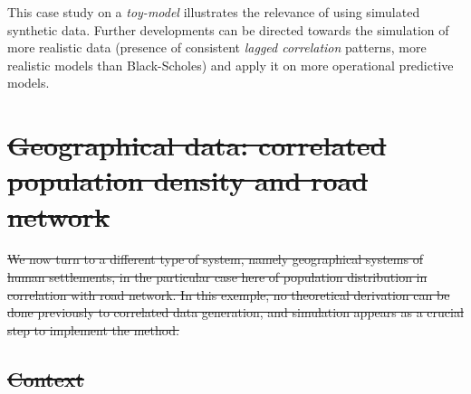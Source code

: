 \documentclass{bmcart}
\providecommand{\DIFaddtex}[1]{{\protect\color{blue}\uwave{#1}}} %
\providecommand{\DIFdeltex}[1]{{\protect\color{red}\sout{#1}}}                      %
\providecommand{\DIFaddbegin}{} %
\providecommand{\DIFaddend}{} %
\providecommand{\DIFdelbegin}{} %
\providecommand{\DIFdelend}{} %
\providecommand{\DIFadd}[1]{\texorpdfstring{\DIFaddtex{#1}}{#1}} %
\providecommand{\DIFdel}[1]{\texorpdfstring{\DIFdeltex{#1}}{}} %
\newcommand{\DIFscaledelfig}{0.5}
\newlength{\DIFdelgraphicswidth} %
\newlength{\DIFdelgraphicsheight} %
\newcommand{\DIFaddincludegraphics}[2][]{{\color{blue}\fbox{\DIFOincludegraphics[#1]{#2}}}} %
\newcommand{\DIFdelincludegraphics}[2][]{%
\sbox{\DIFdelgraphicsbox}{\DIFOincludegraphics[#1]{#2}}%
\settoboxwidth{\DIFdelgraphicswidth}{\DIFdelgraphicsbox} %
\settoboxtotalheight{\DIFdelgraphicsheight}{\DIFdelgraphicsbox} %
\scalebox{\DIFscaledelfig}{%
\parbox[b]{\DIFdelgraphicswidth}{\usebox{\DIFdelgraphicsbox}\\[-\baselineskip] \rule{\DIFdelgraphicswidth}{0em}}\llap{\resizebox{\DIFdelgraphicswidth}{\DIFdelgraphicsheight}{%
\setlength{\unitlength}{\DIFdelgraphicswidth}%
\begin{picture}(1,1)%
\thicklines\linethickness{2pt} %
{\color[rgb]{1,0,0}\put(0,0){\framebox(1,1){}}}%
{\color[rgb]{1,0,0}\put(0,0){\line( 1,1){1}}}%
{\color[rgb]{1,0,0}\put(0,1){\line(1,-1){1}}}%
\end{picture}%
}\hspace*{3pt}}} %
} %
\DeclareRobustCommand{\DIFaddbegin}{\DIFOaddbegin \let\includegraphics\DIFaddincludegraphics} %
\DeclareRobustCommand{\DIFaddend}{\DIFOaddend \let\includegraphics\DIFOincludegraphics} %
\DeclareRobustCommand{\DIFdelbegin}{\DIFOdelbegin \let\includegraphics\DIFdelincludegraphics} %
\DeclareRobustCommand{\DIFdelend}{\DIFOaddend \let\includegraphics\DIFOincludegraphics} %
\begin{document}
This case study on a \emph{toy-model} illustrates the relevance of using simulated synthetic data. Further developments can be directed towards the simulation of more realistic data (presence of consistent \emph{lagged correlation} patterns, more realistic models than Black-Scholes) and apply it on more operational predictive models.






\section*{\DIFdelbegin \DIFdel{Geographical data: correlated population density and road network}\DIFdelend \DIFaddbegin \DIFadd{Discussion}\DIFaddend }


\DIFdelbegin \DIFdel{We now turn to a different type of system, namely geographical systems of human settlements, in the particular case here of population distribution in correlation with road network. In this exemple, no theoretical derivation can be done previously to correlated data generation, and simulation appears as a crucial step to implement the method.
 }%

\subsection*{\DIFdel{Context}}
\end{document}
